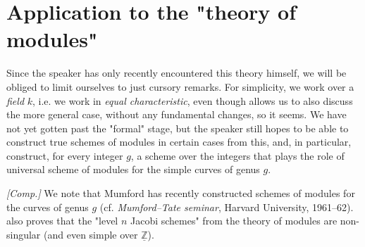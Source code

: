 \section{Application to the "theory of modules"}\label{fga2-7}

Since the speaker has only recently encountered this theory himself, we will be obliged to limit ourselves to just cursory remarks.
For simplicity, we work over a \emph{field} $k$, i.e. we work in \emph{equal characteristic}, even though  allows us to also discuss the more general case, without any fundamental changes, so it seems.
We have not yet gotten past the "formal" stage, but the speaker still hopes to be able to construct true schemes of modules in certain cases from this, and, in particular, construct, for every integer $g$, a scheme over the integers that plays the role of universal scheme of modules for the simple curves of genus $g$.

\begin{remark}\label{fga2-7-remark}
    \emph{[Comp.]}
    We note that Mumford has recently constructed schemes of modules for the curves of genus $g$ (cf. \emph{Mumford–Tate seminar}, Harvard University, 1961–62).
     also proves that the "level $n$ Jacobi schemes" from the theory of modules are non-singular (and even simple over $\underline{\mathbb{Z}}$).
\end{remark}

